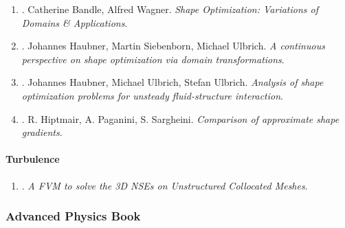 \documentclass{article}
\begin{document}
\begin{enumerate}
	\item \cite{Bandle_Wagner2023}. Catherine Bandle, Alfred Wagner. {\it Shape Optimization: Variations of Domains \& Applications}.\hfill{\sf[reading]}

	\item \cite{Haubner_Siebenborn_Ulbrich2021}. Johannes Haubner, Martin Siebenborn, Michael Ulbrich. {\it A continuous perspective on shape optimization via domain transformations}.\hfill{\sf[done]}

	\item \cite{Haubner_Ulbrich_Ulbrich2020}. Johannes Haubner, Michael Ulbrich, Stefan Ulbrich. {\it Analysis of shape optimization problems for unsteady fluid-structure interaction}.\hfill{\sf[done]}

	\item \cite{Hiptmair_Paganini_Sargheini2015}. R. Hiptmair, A. Paganini, S. Sargheini. {\it Comparison of approximate shape gradients}.\hfill{\sf[done]}
\end{enumerate}

\paragraph{Turbulence}

\begin{enumerate}
	\item \cite{Perron_Boivin_Herard2004}. {\it A FVM to solve the 3{D} NSEs on Unstructured Collocated Meshes}.\hfill{\sf[reading]}
\end{enumerate}


\subsubsection{Advanced Physics Book}
\end{document}
